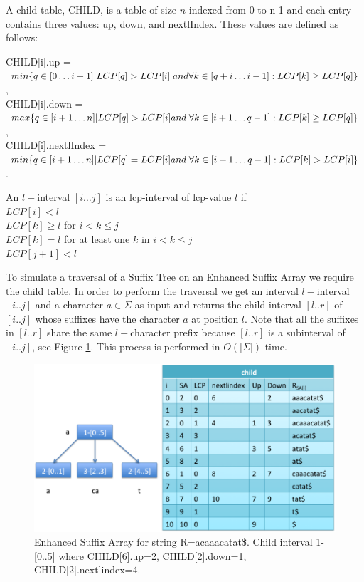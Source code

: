 \documentclass[runningheads,a4paper]{llncs}
\begin{document}
\begin{definition}
A child table, CHILD, is a table of size $n$ indexed from 0 to n-1 and each entry contains three values: up, down, and nextlIndex. These values are defined as follows: 

CHILD[i].up = $min\{q\in [0\ldots i-1]|LCP[q]>LCP[i]\;and\;\\
\forall k\in[q+i\ldots i-1]:LCP[k]\geq LCP[q]\}$,\\
CHILD[i].down = $max\{q\in[i+1\ldots n]|LCP[q]>LCP[i]\\
and\;\forall k\in[i+1\ldots q-1]:LCP[k]\geq LCP[q]\}$,\\
CHILD[i].nextlIndex = $min\{q\in[i+1\ldots n]|LCP[q]=LCP[i]\\
and\;\forall k\in[i+1\ldots q-1]:LCP[k]>LCP[i]\}$.
\end{definition}
\begin{definition}
An $l-$interval $[i\ldots j]$ is an lcp-interval of lcp-value $l$ if\\
$LCP[i]<l$\\
$LCP[k]\geq l$ for $i<k\leq j$\\
$LCP[k]=l$ for at least one $k$ in $i<k\leq j$\\
$LCP[j+1]<l$
\end{definition}
To simulate a traversal of a Suffix Tree on an Enhanced Suffix Array we require the child table. In order to perform the traversal we get an interval $l-$interval $[i..j]$ and a character $a\in \Sigma$ as input and returns the child interval $[l..r]$ of $[i..j]$ whose suffixes have the character $a$ at position $l$. Note that all the suffixes in $[l..r]$ share the same $l-$character prefix because $[l..r]$ is a subinterval of $[i..j]$, see Figure \ref{fig:esa}. This process is performed in $O(|\Sigma|)$ time.
\begin{figure}[h]
  \centering
  \includegraphics[scale=0.35]{child.eps}
  \caption{Enhanced Suffix Array for string R=acaaacatat\$. Child interval 1-[0..5] where CHILD[6].up=2, CHILD[2].down=1, CHILD[2].nextlindex=4.}
  \label{fig:esa}
 \end{figure}  
\end{document}
